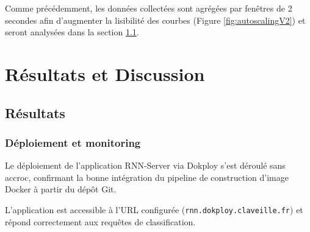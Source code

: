 \documentclass{rapportClass} %
\begin{document}
Comme précédemment, les données collectées sont agrégées par fenêtres de 2 secondes afin d'augmenter la lisibilité des 
courbes (Figure \ref{fig:autoscalingV2}) et seront analysées dans la section \ref{sec:results}.



\chapter{Résultats et Discussion}
\section{Résultats}
\label{sec:results}
\subsection{Déploiement et monitoring}
Le déploiement de l'application RNN-Server via Dokploy s'est déroulé sans accroc,
confirmant la bonne intégration du pipeline de construction d'image Docker à partir du dépôt Git.

\smallskip
L'application est accessible à l'URL configurée (\texttt{rnn.dokploy.claveille.fr}) 
et répond correctement aux requêtes de classification.
\end{document}
